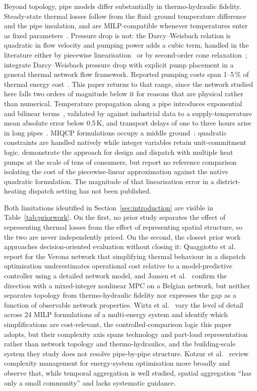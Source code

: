 Beyond topology, pipe models differ substantially in thermo-hydraulic fidelity.
Steady-state thermal losses follow from the fluid--ground temperature difference and the
pipe insulation, and are MILP-compatible whenever temperatures enter as fixed
parameters~\cite{Frederiksen2013}. Pressure drop is not: the Darcy--Weisbach relation is
quadratic in flow velocity and pumping power adds a cubic term, handled in the literature
either by piecewise linearisation~\cite{Bordin2016} or by second-order cone
relaxation~\cite{Blommaert2020}; \citet{Hari2024} integrate Darcy--Weisbach pressure drop
with explicit pump placement in a general thermal network flow framework. Reported pumping
costs span 1--5\,\% of thermal energy cost~\cite{Frederiksen2013}. This paper returns to
that range, since the network studied here falls two orders of magnitude below it for
reasons that are physical rather than numerical. Temperature propagation along a pipe
introduces exponential and bilinear terms~\cite{vanderHeijde2017}, validated by
\citet{Maldonado2024} against industrial data to a supply-temperature mean absolute error
below 0.5\,K, and transport delays of one to three hours arise in long
pipes~\cite{Giraud2015}. MIQCP formulations occupy a middle ground~\cite{Ommen2016}:
quadratic constraints are handled natively while integer variables retain
unit-commitment logic. \citet{Hering2021} demonstrate the approach for design and
dispatch with multiple heat pumps at the scale of tens of consumers, but report no
reference comparison isolating the cost of the piecewise-linear approximation against the
native quadratic formulation. The magnitude of that linearisation error in a
district-heating dispatch setting has not been published.

Both limitations identified in Section~\ref{sec:introduction} are visible in
Table~\ref{tab:priorwork}. On the first, no prior study separates the effect of
representing thermal losses from the effect of representing spatial structure, so
the two are never independently priced. On the second, the closest prior work
approaches decision-oriented evaluation without closing it: Quaggiotto
et al.~\cite{quaggiotto2021} report for the Verona network that simplifying thermal
behaviour in a dispatch optimisation underestimates operational cost relative to a
model-predictive controller using a detailed network model, and Jansen
et al.~\cite{jansen2024} confirm the direction with a mixed-integer nonlinear MPC on
a Belgian network, but neither separates topology from thermo-hydraulic fidelity nor
expresses the gap as a function of observable network properties. Wirtz
et al.~\cite{Wirtz2021_complexity} vary the level of detail across 24 MILP formulations of a
multi-energy system and identify which simplifications are cost-relevant, the
controlled-comparison logic this paper adopts, but their complexity axis spans
technology and part-load representation rather than network topology and
thermo-hydraulics, and the building-scale system they study does not resolve
pipe-by-pipe structure. Kotzur et al.~\cite{kotzur2021} review complexity management
for energy-system optimisation more broadly and observe that, while temporal
aggregation is well studied, spatial aggregation ``has only a small community'' and
lacks systematic guidance.

